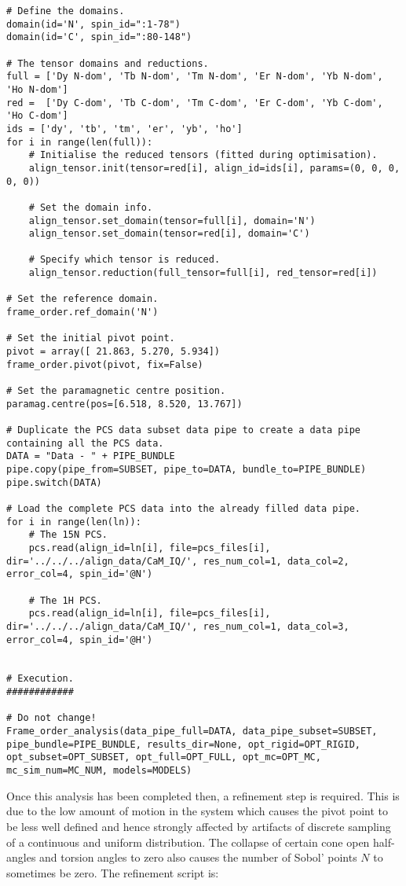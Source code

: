 \begin{lstlisting}
# Define the domains.
domain(id='N', spin_id=":1-78")
domain(id='C', spin_id=":80-148")

# The tensor domains and reductions.
full = ['Dy N-dom', 'Tb N-dom', 'Tm N-dom', 'Er N-dom', 'Yb N-dom', 'Ho N-dom']
red =  ['Dy C-dom', 'Tb C-dom', 'Tm C-dom', 'Er C-dom', 'Yb C-dom', 'Ho C-dom']
ids = ['dy', 'tb', 'tm', 'er', 'yb', 'ho']
for i in range(len(full)):
    # Initialise the reduced tensors (fitted during optimisation).
    align_tensor.init(tensor=red[i], align_id=ids[i], params=(0, 0, 0, 0, 0))

    # Set the domain info.
    align_tensor.set_domain(tensor=full[i], domain='N')
    align_tensor.set_domain(tensor=red[i], domain='C')

    # Specify which tensor is reduced.
    align_tensor.reduction(full_tensor=full[i], red_tensor=red[i])

# Set the reference domain.
frame_order.ref_domain('N')

# Set the initial pivot point.
pivot = array([ 21.863, 5.270, 5.934])
frame_order.pivot(pivot, fix=False)

# Set the paramagnetic centre position.
paramag.centre(pos=[6.518, 8.520, 13.767])

# Duplicate the PCS data subset data pipe to create a data pipe containing all the PCS data.
DATA = "Data - " + PIPE_BUNDLE
pipe.copy(pipe_from=SUBSET, pipe_to=DATA, bundle_to=PIPE_BUNDLE)
pipe.switch(DATA)

# Load the complete PCS data into the already filled data pipe.
for i in range(len(ln)):
    # The 15N PCS.
    pcs.read(align_id=ln[i], file=pcs_files[i], dir='../../../align_data/CaM_IQ/', res_num_col=1, data_col=2, error_col=4, spin_id='@N')

    # The 1H PCS.
    pcs.read(align_id=ln[i], file=pcs_files[i], dir='../../../align_data/CaM_IQ/', res_num_col=1, data_col=3, error_col=4, spin_id='@H')


# Execution.
############

# Do not change!
Frame_order_analysis(data_pipe_full=DATA, data_pipe_subset=SUBSET, pipe_bundle=PIPE_BUNDLE, results_dir=None, opt_rigid=OPT_RIGID, opt_subset=OPT_SUBSET, opt_full=OPT_FULL, opt_mc=OPT_MC, mc_sim_num=MC_NUM, models=MODELS)
\end{lstlisting}

Once this analysis has been completed then, a refinement step is required.
This is due to the low amount of motion in the system which causes the pivot point to be less well defined and hence strongly affected by artifacts of discrete sampling of a continuous and uniform distribution.
The collapse of certain cone open half-angles and torsion angles to zero also causes the number of Sobol' points $N$ to sometimes be zero.
The refinement script is:


